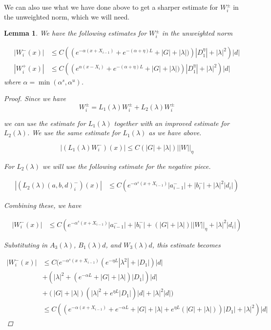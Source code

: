 \documentclass[12pt]{article}
\newtheorem{lemma}{Lemma}
\begin{document}
We can also use what we have done above to get a sharper estimate for $W_i^\pm$ in the unweighted norm, which we will need.

\begin{lemma}
We have the following estimates for $W_i^\pm$ in the unweighted norm

\begin{align*}
| W_i^-(x)| &\leq C\left(\left( e^{-\alpha(x + X_{i-1})} + e^{-(\alpha + \eta) L} + |G| + |\lambda| ) \right) |D_1^{\eta}| + |\lambda|^2 \right) |d| \\
| W_i^+(x)| &\leq C\left(\left( e^{\alpha(x - X_{i})} + e^{-(\alpha + \eta) L} + |G| + |\lambda| ) \right) |D_1^{\eta}| + |\lambda|^2 \right) |d|
\end{align*}
where $\alpha = \min(\alpha^s, \alpha^u)$.

\begin{proof}
Since we have 
\[
W_i^\pm = L_1(\lambda)W_i^\pm + L_2(\lambda)W_i^\pm 
\]

we can use the estimate for $L_1(\lambda)$ together with an improved estimate for $L_2(\lambda)$. We use the same estimate for $L_1(\lambda)$ as we have above.

\[
| (L_1(\lambda) W_i^-)(x) | \leq C\left(|G| +|\lambda|\right)||W||_\eta
\]

For $L_2(\lambda)$ we will use the following estimate for the negative piece.

\begin{align*}
| (L_2(\lambda)(a, b, d)_i^-)(x)| &\leq C \left( e^{-\alpha^s(x + X_{i-1})} |a^-_{i-1}| + |b_i^-| + |\lambda|^2 |d_i| \right)
\end{align*}

Combining these, we have

\begin{align*}
| W_i^-(x)| &\leq C \left( e^{-\alpha^s(x + X_{i-1})} |a^-_{i-1}| + |b_i^-| + \left(|G| +|\lambda|\right)||W||_\eta + |\lambda|^2 |d_i| \right)
\end{align*}

Substituting in $A_3(\lambda)$, $B_1(\lambda)d$, and $W_3(\lambda)d$, this estimate becomes

\begin{align*}
| W_i^-(x)| &\leq C ( e^{-\alpha^s(x + X_{i-1})} \left( e^{-\eta L}|\lambda^2| + |D_1| \right)|d| \\
&+ (|\lambda|^2 + (e^{-\alpha L} + |G| + |\lambda|)|D_1| )|d| \\
&+ \left(|G| +|\lambda|\right)\left( |\lambda|^2 + e^{\eta L}|D_1|\right)|d| + |\lambda|^2 |d| )\\
&\leq C\left(\left( e^{-\alpha(x + X_{i-1})} + e^{-\alpha L} + |G| + |\lambda| + e^{\eta L}(|G| + |\lambda|) \right)|D_1| + |\lambda|^2 \right) |d|
\end{align*}


\end{proof}
\end{lemma}
\end{document}
